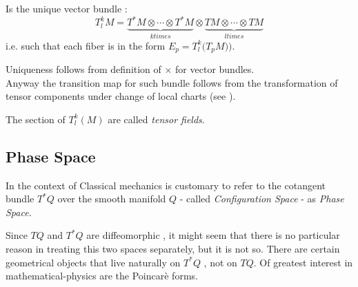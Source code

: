 \documentclass[a4paper,12pt]{scrartcl}    %
\begin{document}
\begin{definition}
Is the unique vector bundle :
	\begin{displaymath}
		T^k_l M = \underbrace{T^*M \otimes \cdots \otimes T^*M}_{k times} \otimes \underbrace{TM \otimes \cdots \otimes TM}_{l times} 
	\end{displaymath}
i.e. such that each fiber is in the form $E_p = T^k_l \big(T_p M) \big) $.	
\end{definition}

\begin{observation}
	Uniqueness follows from definition of $\times$ for vector bundles.
	\\
	Anyway the transition map for such bundle follows from the transformation of tensor components under change of local charts (see \cite{abate}).
\end{observation}

\begin{notationfix}
	The section of $T^k_l(M)$ are called \emph{tensor fields}.
\end{notationfix}

\subsection{Phase Space}

	\begin{notationfix}
In the context of Classical mechanics is customary to refer to the cotangent bundle $T^*Q$ over the smooth manifold  $Q $ - called \emph{Configuration Space}  - as \emph{Phase Space}.\cite{}
	\end{notationfix}
	Since $TQ$ and $T^*Q$ are diffeomorphic , it might seem that there is no particular reason in treating this two spaces separately, but it is not so.
	There are certain geometrical objects that live naturally on $T^*Q$ , not on $TQ$.
	Of greatest interest in mathematical-physics are the Poincarè forms\cite{Fraenkel}.
	
\end{document}
